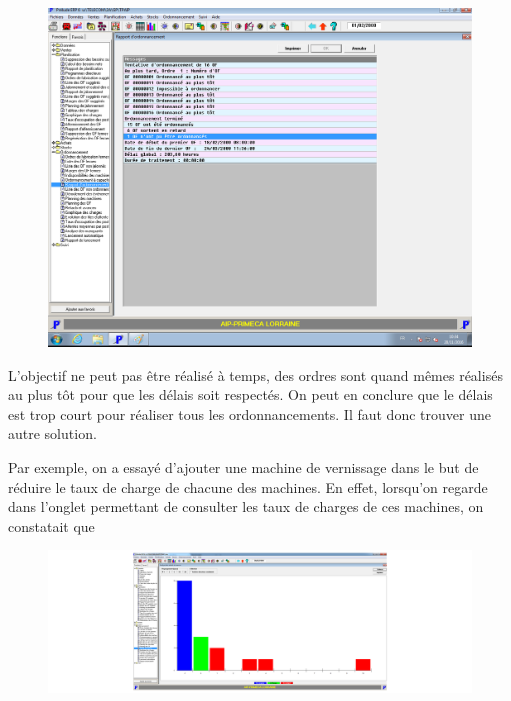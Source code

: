 \documentclass{scrreprt}
\begin{document}
\begin{figure}
   \begin{minipage}[c]{.46\linewidth}
      \includegraphics[scale=0.3]{rapportAuPlusTard.png}
   \end{minipage} \hfill
\end{figure}

L'objectif ne peut pas être réalisé à temps, des ordres sont quand mêmes réalisés au plus tôt pour que les délais soit respectés. On peut en conclure que 
le délais est trop court pour réaliser tous les ordonnancements. Il faut donc trouver une autre solution. 


Par exemple, on a essayé d’ajouter une machine de vernissage dans le but de réduire le taux de charge de chacune des machines. En effet, lorsqu’on regarde dans l’onglet permettant de consulter
les taux de charges de ces machines, on constatait que 

\begin{figure}
   \begin{minipage}[c]{.46\linewidth}
      \includegraphics[scale=0.3]{1vernisenplus.png}
   \end{minipage} \hfill
\end{figure}
\end{document}
